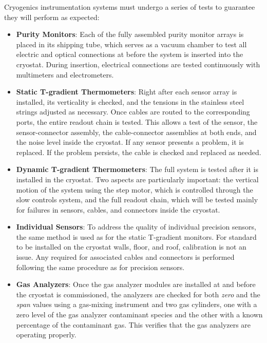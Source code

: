Cryogenics instrumentation systems must undergo a series of tests to guarantee they will perform as expected: 

\begin{itemize}
\item {\bf Purity Monitors}: Each of the fully assembled purity monitor arrays is placed in its shipping tube, which serves as a vacuum chamber to test all electric and optical connections at \surf before the system is inserted into the cryostat. During insertion, electrical connections are tested continuously with multimeters and electrometers.

\item {\bf Static T-gradient Thermometers}: Right after each sensor array is installed, its verticality 
is checked, and the tensions in the stainless steel strings adjusted as necessary. Once cables are routed to the corresponding  ports, the entire readout chain is tested. This allows a test of the sensor, the sensor-connector assembly, the cable-connector assemblies at both ends, and the noise level inside the cryostat.
If any sensor presents a problem, it is replaced. If the problem persists, the cable is checked and replaced as needed.

\item {\bf Dynamic T-gradient Thermometers}: The full system is tested after it is installed in the cryostat. Two aspects are particularly important: the vertical motion of the system using the step motor, which is controlled through the slow controls system, and the full readout chain, which will be tested mainly for failures in sensors, cables, and connectors inside the cryostat. 

\item {\bf Individual Sensors}: To address the quality of individual precision sensors, the same method is used as for
the static T-gradient monitors. For standard  to be installed on the cryostat walls, floor, and roof, calibration is not an issue. Any  required for associated cables and connectors is performed following the same procedure as for precision sensors.

\item {\bf Gas Analyzers}: Once the gas analyzer modules are installed at \surf and before the cryostat is commissioned, the analyzers 
are checked for both \textit{zero} and the \textit{span} values using a gas-mixing instrument and two gas cylinders, one with a
zero level of the gas analyzer contaminant species and the other with a known percentage of the contaminant gas. This verifies that the gas analyzers are operating properly. 


\end{itemize}
